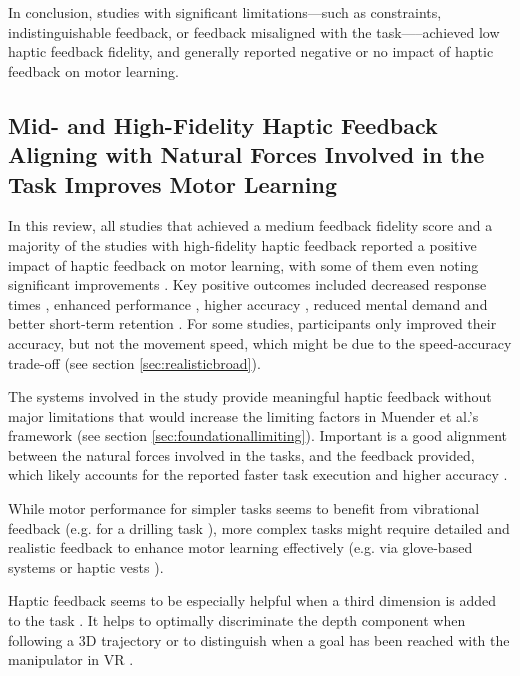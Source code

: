 In conclusion, studies with significant limitations---such as constraints, indistinguishable feedback, or feedback misaligned with the task—--achieved low haptic feedback fidelity, and generally reported negative or no impact of haptic feedback on motor learning.


\subsection{Mid- and High-Fidelity Haptic Feedback Aligning with Natural Forces Involved in the Task Improves Motor Learning}

In this review, all studies that achieved a medium feedback fidelity score and a majority of the studies with high-fidelity haptic feedback reported a positive impact of haptic feedback on motor learning, with some of them even noting significant improvements \cite{Yang2023, LiuH2019, Dai2023, Grant2019, Fehlberg2012, Huang2006}. 
Key positive outcomes included decreased response times \cite{Najdovski2020}, enhanced performance \cite{Chappell2022, Fehlberg2012, LiuG2014, Mohanty2023}, higher accuracy \cite{Perez2023}, reduced mental demand \cite{Yang2023, Manivannan2008, Trinitatova2023} and better short-term retention \cite{LeeH2014}.
For some studies, participants only improved their accuracy, but not the movement speed, which might be due to the speed-accuracy trade-off \cite{LiuG2014, Caccianiga2021} (see section \ref{sec:realisticbroad}).

The systems involved in the study provide meaningful haptic feedback without major limitations that would increase the limiting factors in Muender et al.'s framework (see section \ref{sec:foundationallimiting}). Important is a good alignment between the natural forces involved in the tasks, and the feedback provided, which likely accounts for the reported faster task execution and higher accuracy \cite{Najdovski2020, Yang2023}. 

While motor performance for simpler tasks seems to benefit from vibrational feedback (e.g. for a drilling task \cite{Yang2023, Grant2019}), more complex tasks might require detailed and realistic feedback to enhance motor learning effectively (e.g. via glove-based systems \cite{Trinitatova2023} or haptic vests \cite{Xia2023}).

Haptic feedback seems to be especially helpful when a third dimension is added to the task \cite{Rodriguez2010, Gunter2022, Brickler2019}. It helps to optimally discriminate the depth component when following a 3D trajectory or to distinguish when a goal has been reached with the manipulator in VR \cite{Wall2000}.

